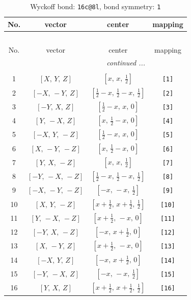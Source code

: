 \documentclass[fleqn,8pt]{jsarticle}
\begin{document}
\begin{longtable}{cccc}
\caption{Wyckoff bond: {\tt 16c@8l}, bond symmetry: {\tt 1}}
 \\
 \hline \hline
No. & vector & center & mapping \\ \hline \endfirsthead

\multicolumn{3}{l}{\tablename\ \thetable{}} \\
 \hline \hline
No. & vector & center & mapping \\ \hline \endhead

 \hline \hline
\multicolumn{3}{r}{\footnotesize\it continued ...} \\ \endfoot

 \hline \hline
\multicolumn{3}{r}{} \\ \endlastfoot

1 & $\left[ X,\, Y,\, Z \right]$ & $\left[ x,\, x,\, \frac{1}{2} \right]$ & {\tt [1]} \\ \hline
2 & $\left[ - X,\, - Y,\, Z \right]$ & $\left[ \frac{1}{2} - x,\, \frac{1}{2} - x,\, \frac{1}{2} \right]$ & {\tt [2]} \\ \hline
3 & $\left[ - Y,\, X,\, Z \right]$ & $\left[ \frac{1}{2} - x,\, x,\, 0 \right]$ & {\tt [3]} \\ \hline
4 & $\left[ Y,\, - X,\, Z \right]$ & $\left[ x,\, \frac{1}{2} - x,\, 0 \right]$ & {\tt [4]} \\ \hline
5 & $\left[ - X,\, Y,\, - Z \right]$ & $\left[ \frac{1}{2} - x,\, x,\, 0 \right]$ & {\tt [5]} \\ \hline
6 & $\left[ X,\, - Y,\, - Z \right]$ & $\left[ x,\, \frac{1}{2} - x,\, 0 \right]$ & {\tt [6]} \\ \hline
7 & $\left[ Y,\, X,\, - Z \right]$ & $\left[ x,\, x,\, \frac{1}{2} \right]$ & {\tt [7]} \\ \hline
8 & $\left[ - Y,\, - X,\, - Z \right]$ & $\left[ \frac{1}{2} - x,\, \frac{1}{2} - x,\, \frac{1}{2} \right]$ & {\tt [8]} \\ \hline
9 & $\left[ - X,\, - Y,\, - Z \right]$ & $\left[ - x,\, - x,\, \frac{1}{2} \right]$ & {\tt [9]} \\ \hline
10 & $\left[ X,\, Y,\, - Z \right]$ & $\left[ x + \frac{1}{2},\, x + \frac{1}{2},\, \frac{1}{2} \right]$ & {\tt [10]} \\ \hline
11 & $\left[ Y,\, - X,\, - Z \right]$ & $\left[ x + \frac{1}{2},\, - x,\, 0 \right]$ & {\tt [11]} \\ \hline
12 & $\left[ - Y,\, X,\, - Z \right]$ & $\left[ - x,\, x + \frac{1}{2},\, 0 \right]$ & {\tt [12]} \\ \hline
13 & $\left[ X,\, - Y,\, Z \right]$ & $\left[ x + \frac{1}{2},\, - x,\, 0 \right]$ & {\tt [13]} \\ \hline
14 & $\left[ - X,\, Y,\, Z \right]$ & $\left[ - x,\, x + \frac{1}{2},\, 0 \right]$ & {\tt [14]} \\ \hline
15 & $\left[ - Y,\, - X,\, Z \right]$ & $\left[ - x,\, - x,\, \frac{1}{2} \right]$ & {\tt [15]} \\ \hline
16 & $\left[ Y,\, X,\, Z \right]$ & $\left[ x + \frac{1}{2},\, x + \frac{1}{2},\, \frac{1}{2} \right]$ & {\tt [16]} \\
\end{longtable}
\end{document}
